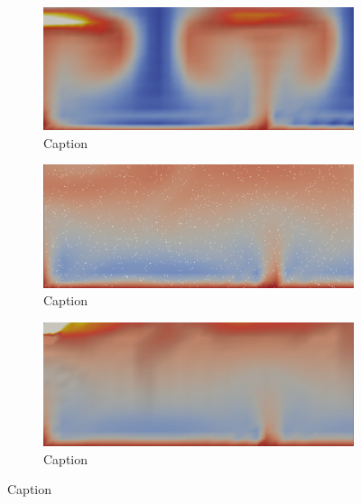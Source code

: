 \begin{figure}
\begin{subfigure}{0.49\textwidth}
        \centering
        \includegraphics[width=\textwidth]{figures/box_2pp38.png}
        \caption{Caption}
        \label{fig:my_label}
    \end{subfigure}
    \begin{subfigure}{0.49\textwidth}
        \centering
        \includegraphics[width=\textwidth]{figures/box_batch79.png}
        \caption{Caption}
        \label{fig:my_label}
    \end{subfigure}
    \hfill
    \begin{subfigure}{0.49\textwidth}
        \centering
        \includegraphics[width=\textwidth]{figures/box_2pp77.png}
        \caption{Caption}
        \label{fig:my_label}
    \end{subfigure}
\end{figure}